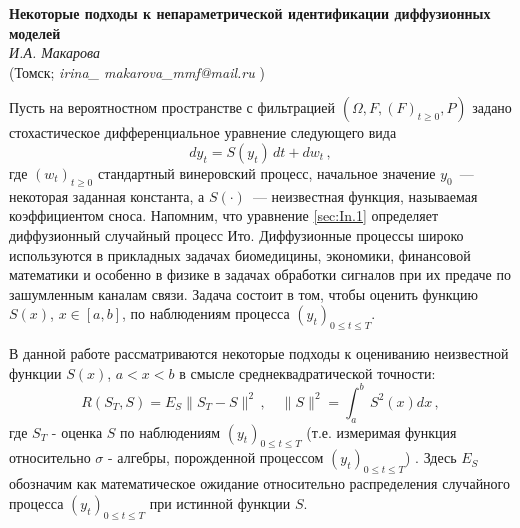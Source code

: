\begin{center}{ \bf  Некоторые подходы к непараметрической идентификации диффузионных моделей}\\
{\it И.А. Макарова } \\
(Томск; {\it irina\_ makarova\_mmf@mail.ru} )
\end{center}


Пусть на вероятностном пространстве с фильтрацией $(\Omega, F, (F)_{t\geqslant 0}, P)$ задано стохастическое дифференциальное уравнение следующего вида
 \begin{equation}\label{sec:In.1}
d y_{t}=S(y_{t})\,d t +d w_{t}\,,
 \end{equation}
где $(w_{t})_{t\geqslant 0}$ стандартный винеровский процесс,
начальное значение $y_{0}$~--- некоторая заданная константа,
а $S(\cdot)$~--- неизвестная функция, называемая коэффициентом сноса.
Напомним, что уравнение \eqref{sec:In.1} определяет диффузионный случайный процесс Ито.
Диффузионные процессы широко используются в прикладных задачах биомедицины, экономики, финансовой математики и особенно в физике в задачах обработки сигналов при их предаче по зашумленным каналам связи.
Задача состоит в том, чтобы оценить функцию $S(x)$, $x\in[a,b]$, по наблюдениям процесса
$(y_{t})_{0\leqslant t\leqslant T}$.

В данной работе рассматриваются некоторые подходы к оцениванию неизвестной функции $S(x)$, $a<x<b$ в смысле среднеквадратической точности:
\begin{equation}\label{sec:In.2}
R({S}_{T},S)=E_{S}\|{S}_{T}-S\|^2\,,
\quad
\|S\|^2=\int^b_{a}\,S^2(x)d x\,,
\end{equation}
где ${S}_{T}$ - оценка
$S$ по наблюдениям $(y_{t})_{0\leqslant t\leqslant T}$ (т.е. измеримая функция относительно $\sigma$ - алгебры, порожденной процессом $(y_{t})_{0\leqslant t\leqslant T}$) . Здесь $E_{S}$ обозначим как математическое ожидание относительно распределения случайного процесса
 $(y_{t})_{0\leqslant t\leqslant T}$ при истинной функции $S$.

